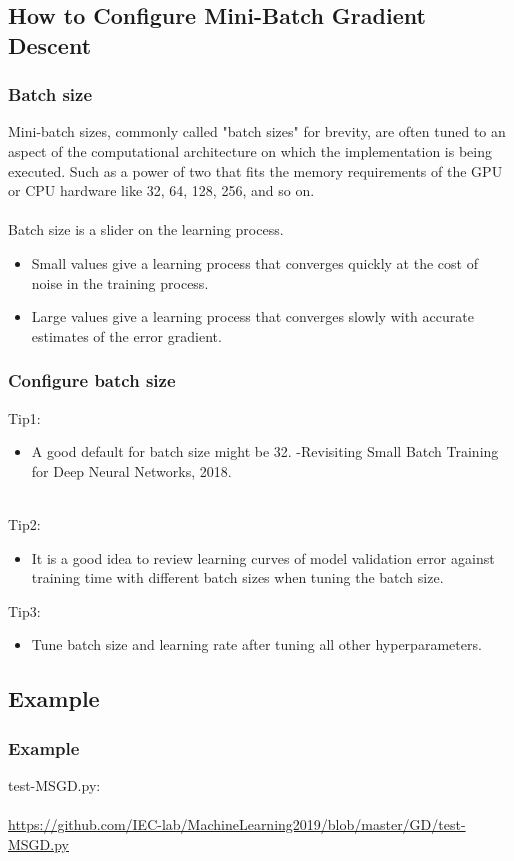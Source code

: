 \documentclass[cjk]{beamer}
\begin{document}
\subsection{How to Configure Mini-Batch Gradient Descent}
\begin{frame}
\frametitle{Batch size}
Mini-batch sizes, commonly called "batch sizes" for brevity, are often tuned to an aspect of the computational architecture on which the implementation is being executed. Such as a power of two that fits the memory requirements of the GPU or CPU hardware like 32, 64, 128, 256, and so on.\\
~\\
Batch size is a slider on the learning process.
\begin{itemize}
\item Small values give a learning process that converges quickly at the cost of noise in the training process.
\item Large values give a learning process that converges slowly with accurate estimates of the error gradient.
\end{itemize}
\end{frame}

\begin{frame}
\frametitle{Configure batch size}
\begin{block}{}
Tip1:
\begin{itemize}
\item A good default for batch size might be 32. \quad-Revisiting Small Batch Training for Deep Neural Networks, 2018.
\end{itemize}
~\\
Tip2:
\begin{itemize}
\item  It is a good idea to review learning curves of model validation error against training time with different batch sizes when tuning the batch size. 
\end{itemize}
Tip3:
\begin{itemize}
\item  Tune batch size and learning rate after tuning all other hyperparameters. 
\end{itemize}
\end{block}
\end{frame}

\subsection{Example}
\begin{frame}
\frametitle{Example}
test-MSGD.py:\\
~\\
\url{https://github.com/IEC-lab/MachineLearning2019/blob/master/GD/test-MSGD.py}
\end{frame}
\end{document}
